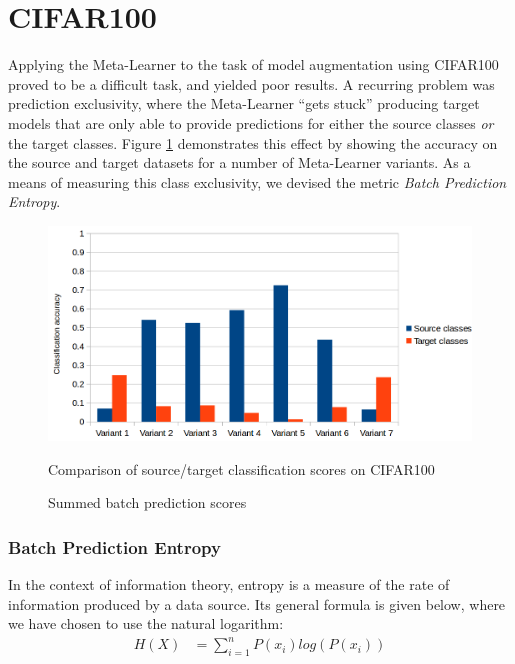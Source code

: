 \documentclass{report}
\begin{document}
\section{CIFAR100}
Applying the Meta-Learner to the task of model augmentation using CIFAR100 proved to be a difficult task, and yielded poor results. A recurring problem was prediction exclusivity, where the Meta-Learner ``gets stuck'' producing target models that are only able to provide predictions for either the source classes \textit{or} the target classes. Figure \ref{fig:cifaraccuracy:1} demonstrates this effect by showing the accuracy on the source and target datasets for a number of Meta-Learner variants. As a means of measuring this class exclusivity, we devised the metric \textit{Batch Prediction Entropy}. \par
\begin{figure}[!h!]
	\centering
	\includegraphics[width=13cm]{cifaraccuracy}
	\caption{Summed batch prediction scores}
	Comparison of source/target classification scores on CIFAR100
	\label{fig:cifaraccuracy:1}
\end{figure}

\subsubsection{Batch Prediction Entropy}
In the context of information theory, entropy is a measure of the rate of information produced by a data source. Its general formula is given below, where we have chosen to use the natural logarithm:
\begin{align}
H(X) &= \sum_{i=1}^{n}P(x_i) log(P(x_i)) \label{entropyfunc}
\end{align}
\end{document}
